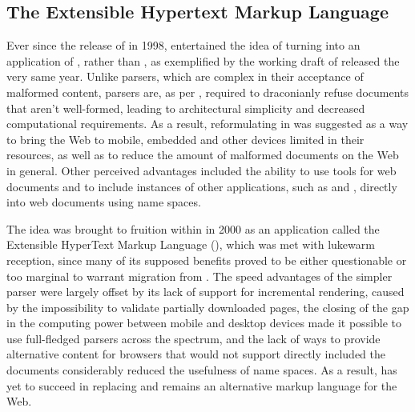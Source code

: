\documentclass{book}
\begin{document}

      \subsection{The Extensible Hypertext Markup Language}
        Ever since the release of  in 1998, 
        entertained the idea of turning  into an application of
        , rather than , as exemplified by the working
        draft of \cite{raggett98} released the very same year. Unlike
         parsers, which are complex in their acceptance of
        malformed content,  parsers are, as per \cite[Section~1.2,
        Terminology]{bray98}, required to draconianly refuse 
        documents that aren't well-formed, leading to architectural simplicity
        and decreased computational requirements. As a result, reformulating
         in  was suggested as a way to bring the Web
        to mobile, embedded and other devices limited in their resources, as
        well as to reduce the amount of malformed documents on the Web in
        general. Other perceived advantages included the ability to use
         tools for web documents and to include instances of other
         applications, such as  and ,
        directly into web documents using  name spaces.

        The idea was brought to fruition within \cite{pemberton00} in 2000 as an
         application called the Extensible HyperText Markup
        Language (), which was met with lukewarm reception, since
        many of its supposed benefits proved to be either questionable or too
        marginal to warrant migration from .  The speed advantages
        of the simpler parser were largely offset by its lack of support for
        incremental rendering, caused by the impossibility to validate partially
        downloaded pages, the closing of the gap in the computing power between
        mobile and desktop devices made it possible to use full-fledged
         parsers across the spectrum, and the lack of ways to
        provide alternative content for browsers that would not support directly
        included the  documents considerably reduced the usefulness
        of  name spaces. As a result,  has yet to
        succeed in replacing  and remains an alternative markup
        language for the Web.
\end{document}

